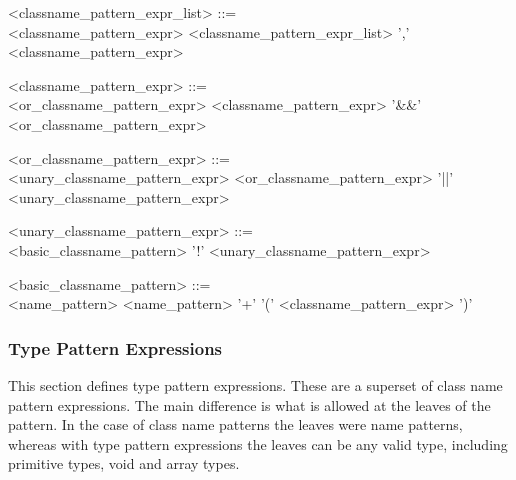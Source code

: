 \begin{minipage}{6in}
\begin{blue}
\begin{grammar}
<classname_pattern_expr_list> ::= \hspace{1in} \\
     <classname_pattern_expr> 
\alt <classname_pattern_expr_list> ',' <classname_pattern_expr>

<classname_pattern_expr> ::= \hspace{1in} \\
     <or_classname_pattern_expr>
\alt <classname_pattern_expr> '\&\&' <or_classname_pattern_expr>

<or_classname_pattern_expr> ::= \hspace{1in} \\
     <unary_classname_pattern_expr>
\alt <or_classname_pattern_expr> '||' <unary_classname_pattern_expr>

<unary_classname_pattern_expr> ::= \hspace{1in} \\
     <basic_classname_pattern>
\alt '!' <unary_classname_pattern_expr>

<basic_classname_pattern> ::=  \hspace{1in} \\
     <name_pattern>
\alt <name_pattern> '+'
\alt '(' <classname_pattern_expr> ')'
\end{grammar}
\end{blue}
\end{minipage}

\subsubsection{Type Pattern Expressions}

This section defines type pattern expressions.   These are a superset of
class name pattern expressions.  The main difference is what is allowed
at the leaves of the pattern.   In the case of class name patterns the
leaves were name patterns,  whereas with type pattern expressions the
leaves can be any valid type, including primitive types, void and
array types.

